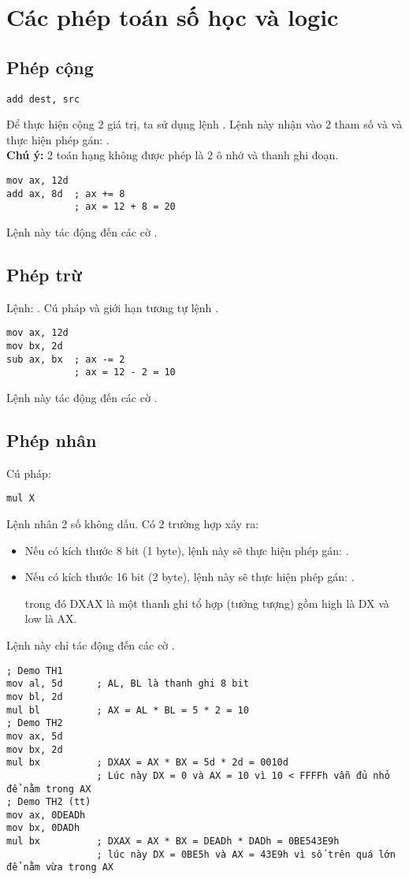 \documentclass[main.tex]{subfiles}
\begin{document}
\section{Các phép toán số học và logic}
\subsection{Phép cộng}
\begin{verbatim}
add dest, src
\end{verbatim}
Để thực hiện cộng 2 giá trị, ta sử dụng lệnh . Lệnh này nhận vào 2 tham số  và  và thực hiện phép gán: .\\
\textbf{Chú ý:} 2 toán hạng không được phép là 2 ô nhớ và thanh ghi đoạn.
\begin{verbatim}
mov ax, 12d 
add ax, 8d  ; ax += 8
            ; ax = 12 + 8 = 20 
\end{verbatim}
Lệnh này tác động đến các cờ .

\subsection{Phép trừ}
Lệnh: . Cú pháp và giới hạn tương tự lệnh .
\begin{verbatim}
mov ax, 12d 
mov bx, 2d
sub ax, bx  ; ax -= 2
            ; ax = 12 - 2 = 10 
\end{verbatim}
Lệnh này tác động đến các cờ .

\subsection{Phép nhân}
Cú pháp: 
\begin{verbatim}
mul X
\end{verbatim}
Lệnh  nhân 2 số không dấu.
Có 2 trường hợp xảy ra:
\begin{itemize}
    \item Nếu  có kích thước 8 bit (1 byte), lệnh này sẽ thực hiện phép gán: .
    \item Nếu  có kích thước 16 bit (2 byte), lệnh này sẽ thực hiện phép gán: .
    \par trong đó DXAX là một thanh ghi tổ hợp (tưởng tượng) gồm high là DX và low là AX.
\end{itemize} 
Lệnh này chỉ tác động đến các cờ .


\begin{verbatim}
; Demo TH1 
mov al, 5d      ; AL, BL là thanh ghi 8 bit
mov bl, 2d 
mul bl          ; AX = AL * BL = 5 * 2 = 10
; Demo TH2 
mov ax, 5d 
mov bx, 2d 
mul bx          ; DXAX = AX * BX = 5d * 2d = 0010d
                ; Lúc này DX = 0 và AX = 10 vì 10 < FFFFh vẫn đủ nhỏ để nằm trong AX
; Demo TH2 (tt)
mov ax, 0DEADh
mov bx, 0DADh
mul bx          ; DXAX = AX * BX = DEADh * DADh = 0BE543E9h
                ; lúc này DX = 0BE5h và AX = 43E9h vì số trên quá lớn để nằm vừa trong AX
\end{verbatim}
\end{document}
